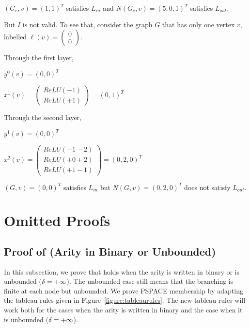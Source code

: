 $(G_e, v) = (1,1)^T$ satisfies $L_{in}$ and $N(G_e,v) = (5,0,1)^T$ satisfies $L_{out}$.

But $I$ is not valid.
To see that, consider the graph $G$ that has only one vertex $v$, labelled $\ell(v) = \begin{pmatrix}
        0\\0
\end{pmatrix}$.

Through the first layer,

$y^0(v) 
= (0,0)^T$

$x^1(v)
=  \begin{pmatrix}
    ReLU(- 1) \\
    ReLU(+ 1)
    \end{pmatrix} 
= (0, 1)^T$

Through the second layer,

$y^1(v) 
= (0,0)^T$

$x^2 (v) 
= \begin{pmatrix}
    ReLU(- 1 - 2) \\
    ReLU(+ 0 + 2) \\
    ReLU(+ 1 - 1)
    \end{pmatrix}
= (0,2,0)^T$

$(G, v) = (0,0)^T$ satisfies $L_{in}$ but $N(G,v) = (0,2,0)^T$ does not satisfy $L_{out}$.

















\section{Omitted Proofs}






\subsection{Proof of  (Arity in Binary or Unbounded)}
\label{sec:proofs-arity-binary-or-unbounded}

In this subsection, we prove that  holds when the arity is written in binary or is unbounded ($\delta = +\infty$). The unbounded case still means that the branching is finite at each node but unbounded. We prove PSPACE membership by adapting the tableau rules given in Figure~\ref{figure:tableaurules}. The new tableau rules will work both for the cases when the arity is written in binary and the case when it is unbounded ($\delta = +\infty$).

